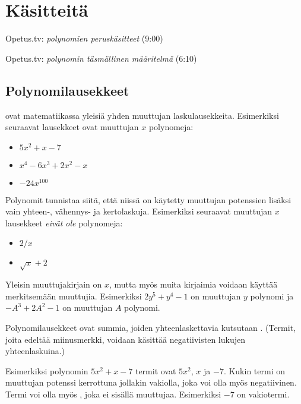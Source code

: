 \section{Käsitteitä}

{Opetus.tv: \emph{polynomien peruskäsitteet} (9:00)}

{Opetus.tv: \emph{polynomin täsmällinen määritelmä} (6:10)}

\subsection*{Polynomilausekkeet}

 ovat matematiikassa yleisiä yhden muuttujan laskulausekkeita.
Esimerkiksi seuraavat lausekkeet ovat muuttujan $x$ polynomeja:
\begin{itemize}
\item $5x^2+x-7$
\item $x^4-6x^3+2x^2-x$
\item $-24x^{100}$
\end{itemize}
Polynomit tunnistaa siitä, että niissä on käytetty muuttujan potenssien lisäksi vain yhteen-, vähennys- ja kertolaskuja. Esimerkiksi seuraavat muuttujan $x$ lausekkeet \emph{eivät ole} polynomeja:
\begin{itemize}
\item $2/x$
\item $\sqrt{x}+2$
\end{itemize}
Yleisin muuttujakirjain on $x$, mutta myös muita kirjaimia voidaan käyttää
merkitsemään muuttujia. Esimerkiksi $2y^5+y^4-1$ on muuttujan $y$ polynomi ja
$-A^3+2A^2-1$ on muuttujan $A$ polynomi.

Polynomilausekkeet ovat summia, joiden yhteenlaskettavia kutsutaan . (Termit, joita edeltää miinusmerkki, voidaan käsittää negatiivisten lukujen yhteenlaskuina.)

Esimerkiksi polynomin $5x^2+x-7$ termit ovat $5x^2$, $x$ ja $-7$. Kukin termi on muuttujan potenssi kerrottuna jollakin vakiolla, joka voi olla myös negatiivinen. Termi voi olla myös , joka ei sisällä muuttujaa. Esimerkiksi $-7$ on vakiotermi.

